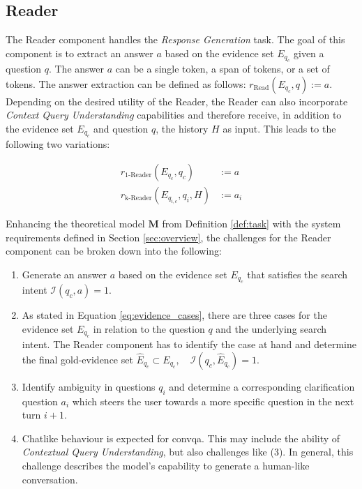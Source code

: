 \subsection{Reader}
\label{subsec:reader}

The Reader component handles the \textit{Response Generation} task. The goal of this component is to extract an answer $a$ based on the evidence set $E_{q_c}$ given a question $q$. The answer $a$ can be a single token, a span of tokens, or a set of tokens. The answer extraction can be defined as follows: $r_{\text{Read}}(E_{q_c}, q) := a$. Depending on the desired utility of the Reader, the Reader can also incorporate \textit{Context Query Understanding} capabilities and therefore receive, in addition to the evidence set $E_{q_c}$ and question $q$, the history $H$ as input. This leads to the following two variations:

\begin{align}
    r_{\text{1-Reader}}(E_{q_c}, q_c) &:= a \label{eq:reader} \\
    r_{\text{k-Reader}}(E_{q_{i,c}}, q_{i}, H) &:= a_{i} \label{eq:reader_context}
\end{align}

Enhancing the theoretical model $\mathbf{M}$ from Definition \ref{def:task} with the system requirements defined in Section \ref{sec:overview}, the challenges for the Reader component can be broken down into the following:

\begin{enumerate}
    \item Generate an answer $a$ based on the evidence set $E_{q_c}$ that satisfies the search intent $\mathcal{I}(q_c, a) = 1$.
    \item As stated in Equation \ref{eq:evidence_cases}, there are three cases for the evidence set $E_{q_c}$ in relation to the question $q$ and the underlying search intent. The Reader component has to identify the case at hand and determine the final gold-evidence set $\hat{E}_{q_c} \subset E_{q_c}, \quad \mathcal{I}(q_c, \hat{E}_{q_c}) = 1$.
    \item Identify ambiguity in questions $q_{i}$ and determine a corresponding clarification question $a_{i}$ which steers the user towards a more specific question in the next turn $i+1$.
    \item Chatlike behaviour is expected for \gls{convqa}. This may include the ability of \textit{Contextual Query Understanding}, but also challenges like (3). In general, this challenge describes the model's capability to generate a human-like conversation. 
\end{enumerate}

